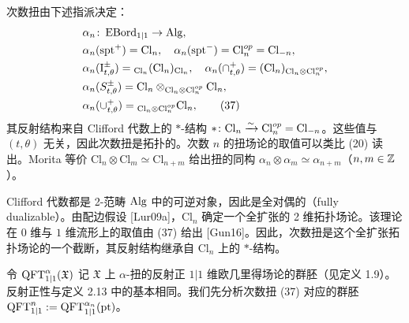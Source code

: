 \begin{definition}[3.18（次数扭）]
次数扭由下述指派决定：
\begin{align}
&\alpha_n\colon\operatorname{EBord}_{1|1}\to\operatorname{Alg},\notag\\
&\alpha_n(\mathrm{spt}^+)=\mathrm{Cl}_n,\quad \alpha_n(\mathrm{spt}^-)=\mathrm{Cl}^{op}_n=\mathrm{Cl}_{-n},\notag\\
&\alpha_n(\mathrm{I}^\pm_{t,\theta})={}_{\mathrm{Cl}_n}(\mathrm{Cl}_n)_{\mathrm{Cl}_n},\quad
 \alpha_n(\cap^+_{t,\theta})=(\mathrm{Cl}_n)_{\mathrm{Cl}_n\otimes\mathrm{Cl}^{op}_n},\notag\\
&\alpha_n(S^\pm_{t,\theta})=\mathrm{Cl}_n\otimes_{\mathrm{Cl}_n\otimes\mathrm{Cl}^{op}_n}\mathrm{Cl}_n,\notag\\
&\alpha_n(\cup^+_{t,\theta})={}_{\mathrm{Cl}_n\otimes\mathrm{Cl}^{op}_n}\mathrm{Cl}_n,\tag{37}
\end{align}
其反射结构来自 Clifford 代数上的 $\ast$-结构 $\ast\colon\mathrm{Cl}_n\xrightarrow{\sim}\mathrm{Cl}^{op}_n=\mathrm{Cl}_{-n}$。这些值与 $(t,\theta)$ 无关，因此次数扭是拓扑的。次数 $n$ 的扭场论的取值可以类比 (20) 读出。Morita 等价 $\mathrm{Cl}_n\otimes\mathrm{Cl}_m\simeq\mathrm{Cl}_{n+m}$ 给出扭的同构 $\alpha_n\otimes\alpha_m\simeq\alpha_{n+m}$（$n,m\in\mathbb{Z}$）。
\end{definition}

\begin{remark}[3.19]
Clifford 代数都是 2-范畴 $\operatorname{Alg}$ 中的可逆对象，因此是全对偶的（fully dualizable）。由配边假设 [Lur09a]，$\mathrm{Cl}_n$ 确定一个全扩张的 2 维拓扑场论。该理论在 $0$ 维与 $1$ 维流形上的取值由 (37) 给出 [Gun16]。因此，次数扭是这个全扩张拓扑场论的一个截断，其反射结构继承自 $\mathrm{Cl}_n$ 上的 $\ast$-结构。
\end{remark}

令 $\operatorname{QFT}^\alpha_{1|1}(\mathfrak X)$ 记 $\mathfrak X$ 上 $\alpha$-扭的反射正 $1|1$ 维欧几里得场论的群胚（见定义 1.9）。反射正性与定义 2.13 中的基本相同。我们先分析次数扭 (37) 对应的群胚 $\operatorname{QFT}^n_{1|1}:=\operatorname{QFT}^{\alpha_n}_{1|1}(\mathrm{pt})$。

